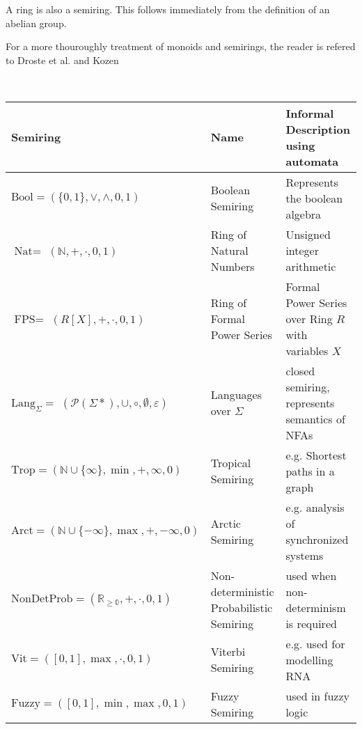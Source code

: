             \begin{remark}
                A ring is also a semiring. This follows immediately from the definition of an abelian group.
            \end{remark}
            
            For a more thouroughly treatment of monoids and semirings, the reader is refered to Droste et al. and Kozen~\autocite{HWA, CS}
                        
            \begin{example}~\autocite{WA}
                
                \begin{table}[htp]
                \centering
                \begin{tabular}{|p{5cm}|p{4cm}|p{4cm}|} 
                \hline
                Semiring & Name & Informal Description using automata \\ [0.5ex] 
                \hline\hline
                $\text{Bool}=(\{ 0, 1\}, \vee, \wedge, 0, 1)$ & Boolean Semiring & Represents the boolean algebra \\ \hline
                $\text{Nat}=$ $(\mathbb{N}, +, \cdot, 0, 1)$ & Ring of Natural Numbers & Unsigned integer arithmetic \\ \hline
                $\text{FPS}=$ $(R[X], +, \cdot, 0, 1)$ & Ring of Formal Power Series & Formal Power Series over Ring $R$ with variables $X$ \\ \hline
                $\text{Lang}_{\Sigma} =$ $(\mathcal{P}(\Sigma*), \cup, \circ, \emptyset, \varepsilon)$ & Languages over $\Sigma$ & closed semiring, represents semantics of NFAs \\ \hline
                $\text{Trop}=(\mathbb{N} \cup \{\infty\}, \min, +, \infty, 0)$ & Tropical Semiring & e.g. Shortest paths in a graph \\ \hline
                $\text{Arct}=(\mathbb{N} \cup \{-\infty\}, \max, +, -\infty, 0)$ & Arctic Semiring & e.g. analysis of synchronized systems \\ \hline
                 $\text{NonDetProb}=(\mathbb{R_{\geq 0}}, +, \cdot, 0, 1)$ & Non-deterministic Probabilistic Semiring & used when non-determinism is required \\ \hline
                 $\text{Vit}=([0, 1], \max, \cdot, 0, 1)$ & Viterbi Semiring & e.g. used for modelling RNA\\ \hline
                 $\text{Fuzzy}=([0, 1], \min, \max, 0, 1)$ & Fuzzy Semiring & used in fuzzy logic \\ \hline
                 

\end{tabular}
\end{table}
\end{example}
